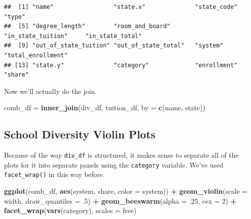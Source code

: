 \documentclass[
]{article}
\newenvironment{Shaded}{\begin{snugshade}}{\end{snugshade}}
\newcommand{\DataTypeTok}[1]{\textcolor[rgb]{0.13,0.29,0.53}{#1}}
\newcommand{\DecValTok}[1]{\textcolor[rgb]{0.00,0.00,0.81}{#1}}
\newcommand{\FloatTok}[1]{\textcolor[rgb]{0.00,0.00,0.81}{#1}}
\newcommand{\KeywordTok}[1]{\textcolor[rgb]{0.13,0.29,0.53}{\textbf{#1}}}
\newcommand{\NormalTok}[1]{#1}
\newcommand{\OperatorTok}[1]{\textcolor[rgb]{0.81,0.36,0.00}{\textbf{#1}}}
\newcommand{\StringTok}[1]{\textcolor[rgb]{0.31,0.60,0.02}{#1}}
\begin{document}
\begin{verbatim}
##  [1] "name"                 "state.x"              "state_code"           "type"                
##  [5] "degree_length"        "room_and_board"       "in_state_tuition"     "in_state_total"      
##  [9] "out_of_state_tuition" "out_of_state_total"   "system"               "total_enrollment"    
## [13] "state.y"              "category"             "enrollment"           "share"
\end{verbatim}

Now we'll actually do the join.

\begin{Shaded}
\begin{Highlighting}[]
\NormalTok{comb\_df =}\StringTok{ }\KeywordTok{inner\_join}\NormalTok{(div\_df, tuition\_df, }\DataTypeTok{by =} \KeywordTok{c}\NormalTok{(}\StringTok{\textquotesingle{}name\textquotesingle{}}\NormalTok{, }\StringTok{\textquotesingle{}state\textquotesingle{}}\NormalTok{))}
\end{Highlighting}
\end{Shaded}

\hypertarget{school-diversity-violin-plots}{%
\subsection{School Diversity Violin Plots}\label{school-diversity-violin-plots}}

Because of the way \texttt{div\_df} is structured, it makes sense to separate all of the plots for it into separate panels using the \texttt{category} variable. We've used \texttt{facet\_wrap()} in this way before.

\begin{Shaded}
\begin{Highlighting}[]
\KeywordTok{ggplot}\NormalTok{(comb\_df, }\KeywordTok{aes}\NormalTok{(system, share, }\DataTypeTok{color =}\NormalTok{ system)) }\OperatorTok{+}
\StringTok{    }\KeywordTok{geom\_violin}\NormalTok{(}\DataTypeTok{scale =} \StringTok{\textquotesingle{}width\textquotesingle{}}\NormalTok{,}
                \DataTypeTok{draw\_quantiles =} \FloatTok{.5}\NormalTok{) }\OperatorTok{+}
\StringTok{    }\KeywordTok{geom\_beeswarm}\NormalTok{(}\DataTypeTok{alpha =} \FloatTok{.25}\NormalTok{, }\DataTypeTok{cex =} \DecValTok{2}\NormalTok{) }\OperatorTok{+}
\StringTok{    }\KeywordTok{facet\_wrap}\NormalTok{(}\KeywordTok{vars}\NormalTok{(category), }\DataTypeTok{scales =} \StringTok{\textquotesingle{}free\textquotesingle{}}\NormalTok{)}
\end{Highlighting}
\end{Shaded}
\end{document}

